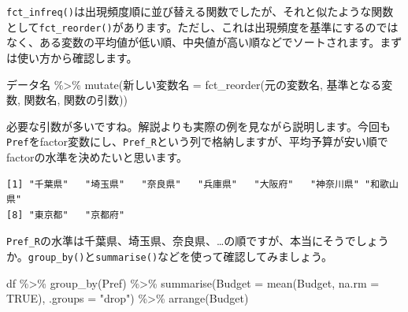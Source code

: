 \documentclass[
  a4paper,
  pandoc,
  ja=standard,
  jafont=haranoaji]{bxjsbook}
\newenvironment{Shaded}{\begin{snugshade}}{\end{snugshade}}
\newcommand{\AttributeTok}[1]{\textcolor[rgb]{0.00,0.48,0.65}{#1}}
\newcommand{\ConstantTok}[1]{\textcolor[rgb]{0.56,0.35,0.01}{#1}}
\newcommand{\FunctionTok}[1]{\textcolor[rgb]{0.28,0.35,0.67}{#1}}
\newcommand{\NormalTok}[1]{\textcolor[rgb]{0.00,0.48,0.65}{#1}}
\newcommand{\OtherTok}[1]{\textcolor[rgb]{0.00,0.48,0.65}{#1}}
\newcommand{\SpecialCharTok}[1]{\textcolor[rgb]{0.37,0.37,0.37}{#1}}
\newcommand{\StringTok}[1]{\textcolor[rgb]{0.13,0.47,0.30}{#1}}
\begin{document}
\texttt{fct\_infreq()}は出現頻度順に並び替える関数でしたが、それと似たような関数として\texttt{fct\_reorder()}があります。ただし、これは出現頻度を基準にするのではなく、ある変数の平均値が低い順、中央値が高い順などでソートされます。まずは使い方から確認します。

\begin{Shaded}
\begin{Highlighting}[numbers=left,,]
\NormalTok{データ名 }\SpecialCharTok{\%\textgreater{}\%}
  \FunctionTok{mutate}\NormalTok{(新しい変数名 }\OtherTok{=} \FunctionTok{fct\_reorder}\NormalTok{(元の変数名, 基準となる変数, }
\NormalTok{                                   関数名, 関数の引数))}
\end{Highlighting}
\end{Shaded}

必要な引数が多いですね。解説よりも実際の例を見ながら説明します。今回も\texttt{Pref}をfactor変数にし、\texttt{Pref\_R}という列で格納しますが、平均予算が安い順でfactorの水準を決めたいと思います。

\begin{Shaded}
\end{Shaded}

\begin{verbatim}
[1] "千葉県"   "埼玉県"   "奈良県"   "兵庫県"   "大阪府"   "神奈川県" "和歌山県"
[8] "東京都"   "京都府"  
\end{verbatim}

\texttt{Pref\_R}の水準は千葉県、埼玉県、奈良県、\ldots の順ですが、本当にそうでしょうか。\texttt{group\_by()}と\texttt{summarise()}などを使って確認してみましょう。

\begin{Shaded}
\begin{Highlighting}[numbers=left,,]
\NormalTok{df }\SpecialCharTok{\%\textgreater{}\%} 
  \FunctionTok{group\_by}\NormalTok{(Pref) }\SpecialCharTok{\%\textgreater{}\%}
  \FunctionTok{summarise}\NormalTok{(}\AttributeTok{Budget  =} \FunctionTok{mean}\NormalTok{(Budget, }\AttributeTok{na.rm =} \ConstantTok{TRUE}\NormalTok{),}
            \AttributeTok{.groups =} \StringTok{"drop"}\NormalTok{) }\SpecialCharTok{\%\textgreater{}\%}
  \FunctionTok{arrange}\NormalTok{(Budget)}
\end{Highlighting}
\end{Shaded}
\end{document}
